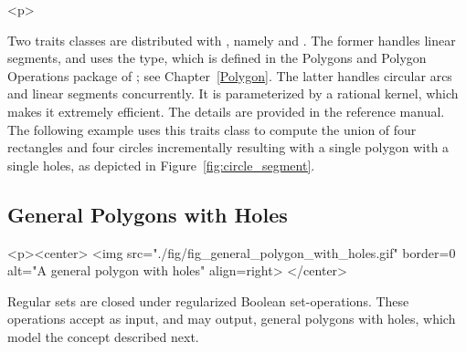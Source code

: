 
\begin{ccHtmlOnly}<p>\end{ccHtmlOnly}
Two traits classes are distributed with \cgal, namely 
 and . 
The former handles linear segments, and uses the  type,
which is defined in the Polygons and Polygon Operations package of 
\cgal; see Chapter~\ref{Polygon}. The latter handles circular arcs
and linear segments concurrently. It is parameterized by a rational 
kernel, which makes it extremely efficient. The details are provided in the 
reference manual. The following example uses this traits class to compute
the union of four rectangles and four circles incrementally resulting with 
a single polygon with a single holes, as depicted in 
Figure~\ref{fig:circle_segment}.


\subsection{General Polygons with Holes}
\label{bso_ssec:general_polygons_with_holes}
\lcHtml{\label{fig:general_polygon_with_holes}}
\begin{ccHtmlOnly}
  <p><center>
    <img src="./fig/fig_general_polygon_with_holes.gif" border=0 alt="A
    general polygon with holes" align=right>
  </center>
\end{ccHtmlOnly}
Regular sets are closed under regularized Boolean set-operations.
These operations accept as input, and may output, general
polygons with holes, which model the concept 
 described next. 


